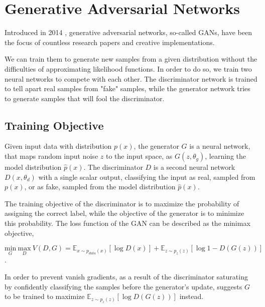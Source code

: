 \documentclass{article}
\begin{document}
\section{Generative Adversarial Networks}


Introduced in 2014 \cite{goodfellow_generative_2014}, generative adversarial  networks, so-called GANs, have been the focus of countless research papers and creative implementations.

We can train them to generate new samples from a given distribution without the difficulties of approximating likelihood functions. In order to do so, we train two neural networks to compete with each other. The discriminator network is trained to tell apart real samples from "fake" samples, while the generator network tries to generate samples that will fool the discriminator.

\subsection{Training Objective}
Given input data with distribution $p(x)$, the generator $G$ is a neural network, that maps random input noise $z$ to the input space, as $G(z, \theta_{g})$, learning the model distribution $\hat{p}(x)$. The discriminator $D$ is a second neural network $D(x, \theta_{d})$ with a single scalar output, classifying the input as real, sampled from $p(x)$, or as fake, sampled from the model distribution $\hat{p}(x)$. 

The training objective of the discriminator is to maximize the probability of assigning the correct label, while the objective of the generator is to minimize this probability. The loss function of the GAN can be described as the minimax objective,

\begin{equation}
\underset{G}{\mathrm{min}} \ \underset{D}{\mathrm{max}} \ V(D,G) = \mathbb{E}_{x \sim p_{data}(x)}[\log D(x)] + \mathbb{E}_{z \sim p_{z}(z)}[\log 1 - D(G(z))]
\label{eq:minimax}
\end{equation}.

In order to prevent vanish gradients, as a result of the discriminator saturating by confidently classifying the samples before the generator's update, \cite{goodfellow_generative_2014} suggests $G$ to be trained to maximize $\mathbb{E}_{z \sim p_{z}(z)}[\log D(G(z))]$ instead.
\end{document}
